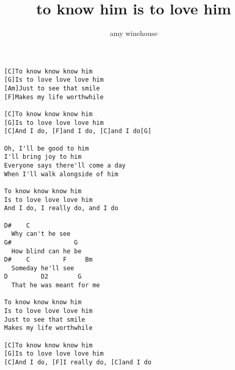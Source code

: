 \author{amy winehouse}
\title{to know him is to love him}
\maketitle
\begin{verbatim}
[C]To know know know him
[G]Is to love love love him
[Am]Just to see that smile
[F]Makes my life worthwhile

[C]To know know know him
[G]Is to love love love him
[C]And I do, [F]and I do, [C]and I do[G]

Oh, I'll be good to him
I'll bring joy to him
Everyone says there'll come a day
When I'll walk alongside of him

To know know know him
Is to love love love him
And I do, I really do, and I do

D#    C
  Why can't he see
G#                 G
  How blind can he be
D#    C         F     Bm
  Someday he'll see
D         D2        G
  That he was meant for me

To know know know him
Is to love love love him
Just to see that smile
Makes my life worthwhile

[C]To know know know him
[G]Is to love love love him
[C]And I do, [F]I really do, [C]and I do
\end{verbatim}